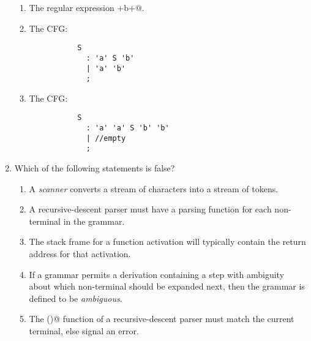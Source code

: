 \documentclass[12pt]{article}
\begin{document}
\begin{enumerate}
\begin{enumerate}
\item The regular expression \verb@a+b+@.

\item The CFG:
\begin{verbatim}
           S
             : 'a' S 'b'
             | 'a' 'b'
             ;
\end{verbatim}

\item The CFG:
\begin{verbatim}
           S
             : 'a' 'a' S 'b' 'b'
             | //empty
             ;
\end{verbatim}

\end{enumerate}

\newpage

\item Which of the following statements is false?

\begin{enumerate}

\item A \textit{scanner} converts a stream of characters into a stream of tokens.

\item A recursive-descent parser must have a parsing function for each
  non-terminal in the grammar.

\item The stack frame for a function activation will typically contain
  the return address for that activation.

\item If a grammar permits a derivation containing a step with
  ambiguity about which non-terminal should be expanded next, then
  the grammar is defined to be \textit{ambiguous}.

\item The \verb@match()@ function of a recursive-descent parser must
match the current terminal, else signal an error.

\end{enumerate}

\end{enumerate}
\end{document}
